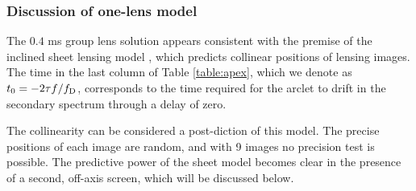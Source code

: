 \documentclass[useAMS,usenatbib]{mn2e}
\begin{document}



\subsubsection{Discussion of one-lens model}
\label{222}
The $0.4$ ms group lens solution appears consistent with the premise
of the inclined sheet lensing model \citep{2014MNRAS.442.3338P}, which
predicts collinear positions of lensing images.  The time in the last
column of Table \ref{table:apex}, which we denote as $t_0
=-2{\tau}f/{f_{\rm D}}$, corresponds to the time required 
for the arclet to drift in the secondary spectrum through a delay of zero.

The collinearity can be considered a post-diction of this model.  The
precise positions of each image are random, and with 9 images no
precision test is possible.  The predictive power of the sheet model
becomes clear in the presence of a second, off-axis screen, which will be discussed below.


\end{document}
